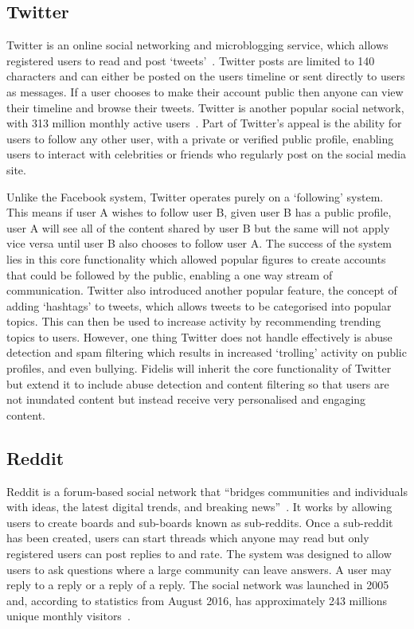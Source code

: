 \subsection{Twitter}
Twitter is an online social networking and microblogging service, which allows registered users to read and post `tweets'~\cite{Statista:Twitter}. Twitter posts are limited to 140 characters and can either be posted on the users timeline or sent directly to users as messages. If a user chooses to make their account public then anyone can view their timeline and browse their tweets. Twitter is another popular social network, with 313 million monthly active users~\cite{Statista:Twitter, Twitter:About}. Part of Twitter's appeal is the ability for users to follow any other user, with a private or verified public profile, enabling users to interact with celebrities or friends who regularly post on the social media site.

Unlike the Facebook system, Twitter operates purely on a `following' system. This means if user A wishes to follow user B, given user B has a public profile, user A will see all of the content shared by user B but the same will not apply vice versa until user B also chooses to follow user A. The success of the system lies in this core functionality which allowed popular figures to create accounts that could be followed by the public, enabling a one way stream of communication. Twitter also introduced another popular feature, the concept of adding `hashtags' to tweets, which allows tweets to be categorised into popular topics. This can then be used to increase activity by recommending trending topics to users. However, one thing Twitter does not handle effectively is abuse detection and spam filtering which results in increased `trolling' activity on public profiles, and even bullying. Fidelis will inherit the core functionality of Twitter but extend it to include abuse detection and content filtering so that users are not inundated content but instead receive very personalised and engaging content.

\subsection{Reddit}
Reddit is a forum-based social network that ``bridges communities and individuals with ideas, the latest digital trends, and breaking news''~\cite{Reddit:About}. It works by allowing users to create boards and sub-boards known as sub-reddits. Once a sub-reddit has been created, users can start threads which anyone may read but only registered users can post replies to and rate. The system was designed to allow users to ask questions where a large community can leave answers. A user may reply to a reply or a reply of a reply. The social network was launched in 2005 and, according to statistics from August 2016, has approximately 243 millions unique monthly visitors~\cite{Statista:Reddit}.

